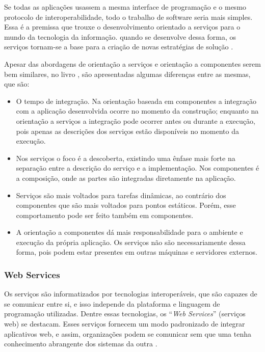 Se todas as aplicações usassem a mesma interface de programação e o mesmo protocolo de interoperabilidade, todo o trabalho de software seria mais simples. Essa é a premissa que trouxe o desenvolvimento orientado a serviços para o mundo da tecnologia da informação. quando se desenvolve dessa forma, os serviços tornam-se a base para a criação de novas estratégias de solução \cite{Newcomer:Lomow:2004}.

Apesar das abordagens de orientação a serviços e orientação a componentes serem bem similares, no livro \cite{Stojanovic:Dahanayake:2005}, são apresentadas algumas diferenças entre as mesmas, que são:

\begin{itemize}
	\item O tempo de integração. Na orientação baseada em componentes a integração com a aplicação desenvolvida ocorre no momento da construção; enquanto na orientação a serviços a integração pode ocorrer antes ou durante a execução, pois apenas as descrições dos serviços estão disponíveis no momento da execução.
	\item Nos serviços o foco é a descoberta, existindo uma ênfase mais forte na separação entre a descrição do serviço e a implementação. Nos componentes é a composição, onde as partes são integradas diretamente na aplicação.
	\item Serviços são mais voltados para tarefas dinâmicas, ao contrário dos componentes que são mais voltados para pontos estáticos. Porém, esse comportamento pode ser feito também em componentes.
	\item A orientação a componentes dá mais responsabilidade para o ambiente e execução da própria aplicação. Os serviços não são necessariamente dessa forma, pois podem estar presentes em outras máquinas e servidores externos.
\end{itemize}

\subsubsection{Web Services}

Os serviços são informatizados por tecnologias interoperáveis, que são capazes de se comunicar entre si, e isso independe da plataforma e linguagem de programação utilizadas. Dentre essas tecnologias, os ``\textit{Web Services}'' (serviços web) se destacam. Esses serviços fornecem um modo padronizado de integrar aplicativos web, e assim, organizações podem se comunicar sem que uma tenha conhecimento abrangente dos sistemas da outra \cite{Victorino:Brascher:2009}.

